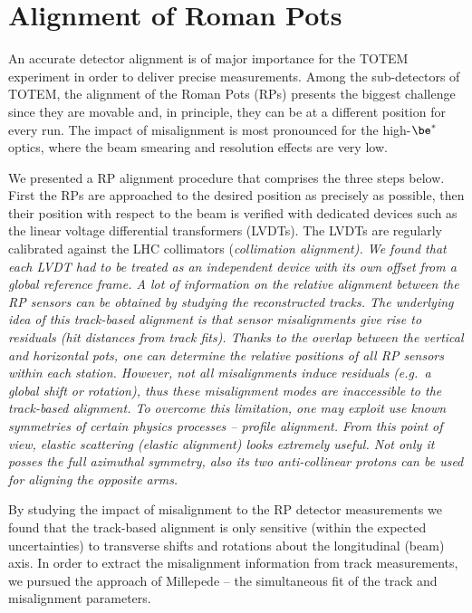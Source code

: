 \chapter[al]{Alignment of Roman Pots}

An accurate detector alignment is of major importance for the TOTEM experiment in order to deliver precise measurements. Among the sub-detectors of TOTEM, the alignment of the Roman Pots (RPs) presents the biggest challenge since they are movable and, in principle, they can be at a different position for every run. The impact of misalignment is most pronounced for the high-$\be^*$ optics, where the beam smearing and resolution effects are very low.

We presented a RP alignment procedure that comprises the three steps below.
\bitm
\itm First the RPs are approached to the desired position as precisely as possible, then their position with respect to the beam is verified with dedicated devices such as the linear voltage differential transformers (LVDTs). The LVDTs are regularly calibrated against the LHC collimators (\em{collimation alignment}). We found that each LVDT had to be treated as an independent device with its own offset from a global reference frame.
%
\itm A lot of information on the relative alignment between the RP sensors can be obtained by studying the reconstructed tracks. The underlying idea of this \em{track-based alignment} is that sensor misalignments give rise to residuals (hit distances from track fits). Thanks to the overlap between the vertical and horizontal pots, one can determine the relative positions of all RP sensors within each station.
%
\itm However, not all misalignments induce residuals (e.g.~a global shift or rotation), thus these misalignment modes are inaccessible to the track-based alignment. To overcome this limitation, one may exploit use known symmetries of certain physics processes -- \em{profile alignment}. From this point of view, elastic scattering (\em{elastic alignment}) looks extremely useful. Not only it posses the full azimuthal symmetry, also its two anti-collinear protons can be used for aligning the opposite arms.
\eitm

\vskip1mm
By studying the impact of misalignment to the RP detector measurements we found that the track-based alignment is only sensitive (within the expected uncertainties) to transverse shifts and rotations about the longitudinal (beam) axis. In order to extract the misalignment information from track measurements, we pursued the approach of Millepede  -- the simultaneous fit of the track and misalignment parameters.

